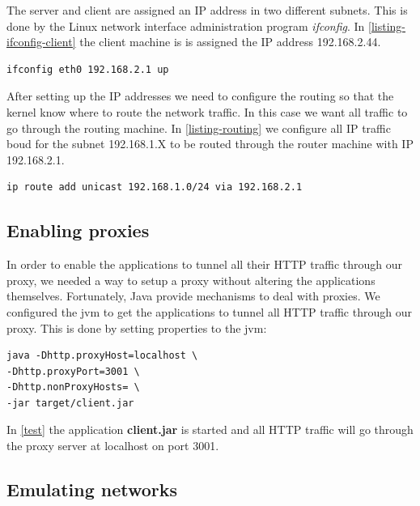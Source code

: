The server and client are assigned an IP address in two different subnets.
This is done by the Linux network interface administration program
\textit{ifconfig}. In \cref{listing-ifconfig-client} the client machine is is
assigned the IP address 192.168.2.44.

\begin{lstlisting}[frame=single, caption="Configuring a network interface of the router", label=listing-ifconfig-client]
ifconfig eth0 192.168.2.1 up
\end{lstlisting}

After setting up the IP addresses we need to configure the routing so that the
kernel know where to route the network traffic. In this case we want all
traffic to go through the routing machine. In \cref{listing-routing} we
configure all IP traffic boud for the subnet 192.168.1.X to be routed through
the router machine with IP 192.168.2.1.

\begin{lstlisting}[frame=single, caption="Configuring routing rules for the client", label=listing-routing]
ip route add unicast 192.168.1.0/24 via 192.168.2.1
\end{lstlisting}


\subsection{Enabling proxies}

In order to enable the applications to tunnel all their HTTP traffic through our
proxy, we needed a way to setup a proxy without altering the applications
themselves. Fortunately, Java provide mechanisms to deal with
proxies\cite{oracle-proxy}. We configured the \gls{jvm} to get the applications
to tunnel all HTTP traffic through our proxy. This is done by setting properties
to the \gls{jvm}:


\begin{lstlisting}[frame=single, caption="Setting a proxy on the \gls{jvm}", label=test]
java -Dhttp.proxyHost=localhost \
-Dhttp.proxyPort=3001 \
-Dhttp.nonProxyHosts= \
-jar target/client.jar
\end{lstlisting}

In \cref{test} the application \textbf{client.jar} is started and all HTTP
traffic will go through the proxy server at localhost on port 3001.

\subsection{Emulating networks}

